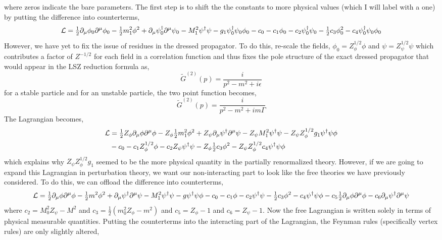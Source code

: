 \documentclass{article}
\begin{document}
where zeros indicate the bare parameters. The first step is to shift the the constants to more physical values (which I will label with a one) by putting the difference into counterterms,
\[ \mathcal{L} = \tfrac{1}{2} \partial_\mu \phi_0 \partial^\mu \phi_0 - \tfrac{1}{2} m_1^2 \phi^2 + \partial_\mu \psi^\dagger_0 \partial^\mu \psi_0 - M_1^2 \psi^\dagger \psi - g_1 \psi^\dagger_0 \psi_0 \phi_0 - c_0 - c_1 \phi_0 - c_2 \psi^\dagger_0 \psi_0 -\tfrac{1}{2} c_3 \phi_0^2 - c_4 \psi^\dagger_0 \psi_0 \phi_0 \]  
However, we have yet to fix the issue of residues in the dressed propagator. To do this, re-scale the fields, $\phi_0 = Z^{1/2}_\phi \phi$ and $\psi = Z^{1/2}_\psi \psi$ which contributes a factor of $Z^{-1/2}$ for each field in a correlation function and thus fixes the pole structure of the exact dressed propagator that would appear in the LSZ reduction formula as,
\[ \tilde{G}^{(2)}(p) = \frac{i}{p^2 - m^2 + i \epsilon} \] 
for a stable particle and for an unstable particle, the two point function becomes,
\[ \tilde{G}^{(2)}(p) = \frac{i}{p^2 - m^2 + i m \Gamma} \] 
The Lagrangian becomes,
\begin{align*}
\mathcal{L} & = \tfrac{1}{2} Z_\phi \partial_\mu \phi \partial^\mu \phi - Z_\phi \tfrac{1}{2} m_1^2 \phi^2 + Z_\psi \partial_\mu \psi^\dagger \partial^\mu \psi - Z_\psi M_1^2 \psi^\dagger \psi - Z_\psi Z_\phi^{1/2} g_1 \psi^\dagger \psi \phi 
\\
& - c_0 - c_1 Z_\phi^{1/2} \phi - c_2 Z_\psi \psi^\dagger \psi - Z_\phi \tfrac{1}{2} c_3 \phi^2 - Z_\psi Z_\phi^{1/2} c_4 \psi^\dagger \psi \phi
\end{align*} 
which explains why $Z_\psi Z_\phi^{1/2} g_1$ seemed to be the more physical quantity in the partially renormalized theory. However, if we are going to expand this Lagrangian in perturbation theory, we want our non-interacting part to look like the free theories we have previously considered. To do this, we can offload the difference into counterterms, 
\[ \mathcal{L} = \tfrac{1}{2} \partial_\mu \phi \partial^\mu \phi -  \tfrac{1}{2} m^2 \phi^2 + \partial_\mu \psi^\dagger \partial^\mu \psi - M_1^2 \psi^\dagger \psi - g \psi^\dagger \psi \phi - c_0 - c_1 \phi - c_2 \psi^\dagger \psi - \tfrac{1}{2} c_3 \phi^2 - c_4 \psi^\dagger \psi \phi - c_5 \tfrac{1}{2} \partial_\mu \phi \partial^\mu \phi - c_6 \partial_\mu \psi^\dagger \partial^\mu \psi \] 
where $c_2 = M_0^2 Z_\psi - M^2$ and $c_3 = \tfrac{1}{2} (m_0^2 Z_\phi - m^2)$ and $c_5 = Z_\phi - 1$ and $c_6 = Z_\psi - 1$. 
Now the free Lagrangian is written solely in terms of physical measurable quantities. 
Putting the counterterms into the interacting part of the Lagrangian, the Feynman rules (specifically vertex rules) are only slightly altered, 
\end{document}
